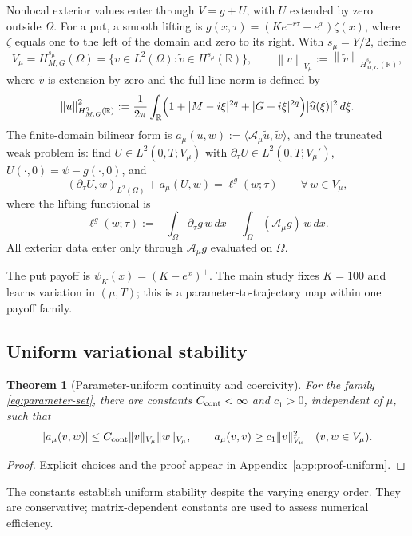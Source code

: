 \documentclass[11pt]{amsart}
\newtheorem{theorem}{Theorem}[section]
\theoremstyle{remark}
\newcommand{\R}{\mathbb{R}}
\newcommand{\Vmu}{V_{\mu}}
\newcommand{\norm}[1]{\left\lVert #1\right\rVert}
\newcommand{\Hs}{H^{s_\mu}_{M,G}}
\newcommand{\Aop}{\mathcal A_\mu}
\begin{document}
Nonlocal exterior values enter through $V=g+U$, with $U$ extended by zero
outside $\Omega$. For a put, a smooth lifting is
$g(x,\tau)=(Ke^{-r\tau}-e^x)\zeta(x)$, where $\zeta$ equals one to the left
of the domain and zero to its right. With $s_\mu=Y/2$, define
\begin{equation}
  \Vmu=\Hs(\Omega)
  =\bigl\{v\in L^2(\Omega):\widetilde v\in H^{s_\mu}(\R)\bigr\},
  \qquad
  \norm{v}_{\Vmu}:=\norm{\widetilde v}_{H^{s_\mu}_{M,G}(\R)},
  \label{eq:energy-space}
\end{equation}
where $\widetilde v$ is extension by zero and the full-line norm is defined by
\begin{equation}
  \norm{u}_{H^{q}_{M,G}(\R)}^2
  :=\frac1{2\pi}\int_\R
  \Bigl(1+|M-i\xi|^{2q}+|G+i\xi|^{2q}\Bigr)|\widehat u(\xi)|^2\,d\xi .
  \label{eq:HMG-norm}
\end{equation}
The finite-domain bilinear form is
$a_\mu(u,w):=\langle\Aop\widetilde u,\widetilde w\rangle$, and the truncated
weak problem is: find $U\in L^2(0,T;\Vmu)$ with
$\partial_\tau U\in L^2(0,T;\Vmu')$, $U(\cdot,0)=\psi-g(\cdot,0)$, and
\begin{equation}
  (\partial_\tau U,w)_{L^2(\Omega)}+a_\mu(U,w)=\ell^g(w;\tau)
  \qquad\forall\,w\in\Vmu,
  \label{eq:weak-problem}
\end{equation}
where the lifting functional is
\begin{equation}
  \ell^{g}(w;\tau)
  :=-\int_\Omega\partial_\tau g\,w\,dx-\int_\Omega(\Aop g)\,w\,dx .
  \label{eq:lifting-functional}
\end{equation}
All exterior data enter only through $\Aop g$ evaluated on $\Omega$.


The put payoff is $\psi_K(x)=(K-e^x)^+$. The main study fixes $K=100$ and
learns variation in $(\mu,T)$; this is a parameter-to-trajectory map within
one payoff family.

\subsection{Uniform variational stability}
\label{ssec:uniform}
\begin{theorem}[Parameter-uniform continuity and coercivity]
\label{thm:uniform-coercivity}
For the family \eqref{eq:parameter-set}, there are constants
$C_{\rm cont}<\infty$ and $c_1>0$, independent of $\mu$, such that
\begin{equation}
 |a_\mu(v,w)|\le C_{\rm cont}\|v\|_{V_\mu}\|w\|_{V_\mu},
 \qquad a_\mu(v,v)\ge c_1\|v\|_{V_\mu}^2
 \quad(v,w\in V_\mu).
 \label{eq:uniform-coercivity}
\end{equation}
\end{theorem}
\begin{proof}
Explicit choices and the proof appear in Appendix~\ref{app:proof-uniform}.
\end{proof}
The constants establish uniform stability despite the varying energy order.
They are conservative; matrix-dependent constants are used to assess
numerical efficiency.
\end{document}
